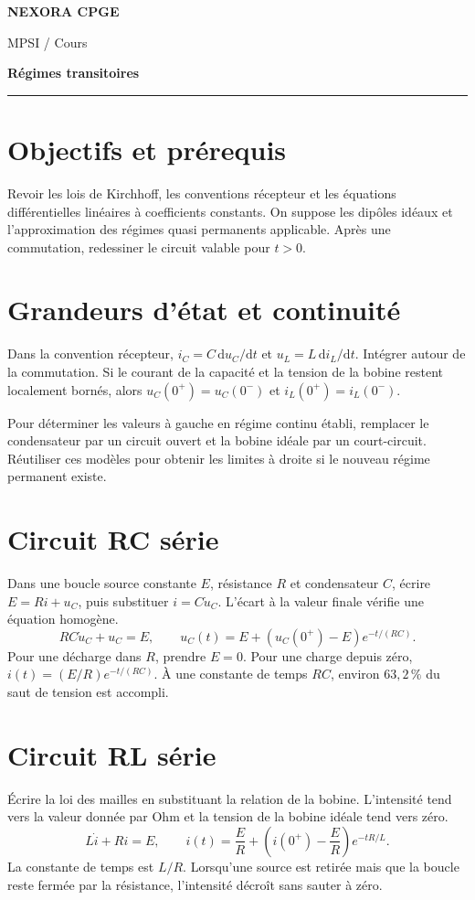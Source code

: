\documentclass[11pt,a4paper]{article}
\begin{document}
\makeatletter
\def\@oddfoot{\footnotesize Download for free at \url{https://openstax.org/details/books/university-physics-volume-2}.\hfil\thepage}
\let\@evenfoot\@oddfoot
\makeatother
{\small\bfseries\color{nexorablue} NEXORA CPGE}\par
{\small MPSI / Cours}\par
{\LARGE\bfseries Régimes transitoires}\par
\vspace{0.25em}\hrule\vspace{0.6em}

\section*{Objectifs et prérequis}
Revoir les lois de Kirchhoff, les conventions récepteur et les équations différentielles linéaires à coefficients constants. On suppose les dipôles idéaux et l’approximation des régimes quasi permanents applicable. Après une commutation, redessiner le circuit valable pour $t>0$.

\section*{Grandeurs d’état et continuité}
Dans la convention récepteur, $i_C=C\,\mathrm du_C/\mathrm dt$ et $u_L=L\,\mathrm di_L/\mathrm dt$. Intégrer autour de la commutation. Si le courant de la capacité et la tension de la bobine restent localement bornés, alors $u_C(0^+)=u_C(0^-)$ et $i_L(0^+)=i_L(0^-)$.

Pour déterminer les valeurs à gauche en régime continu établi, remplacer le condensateur par un circuit ouvert et la bobine idéale par un court-circuit. Réutiliser ces modèles pour obtenir les limites à droite si le nouveau régime permanent existe.

\section*{Circuit RC série}
Dans une boucle source constante $E$, résistance $R$ et condensateur $C$, écrire $E=Ri+u_C$, puis substituer $i=C\dot u_C$. L’écart à la valeur finale vérifie une équation homogène.
\[ RC\dot u_C+u_C=E,\qquad u_C(t)=E+(u_C(0^+)-E)e^{-t/(RC)}. \]
Pour une décharge dans $R$, prendre $E=0$. Pour une charge depuis zéro, $i(t)=(E/R)e^{-t/(RC)}$. À une constante de temps $RC$, environ $63{,}2\,\%$ du saut de tension est accompli.

\section*{Circuit RL série}
Écrire la loi des mailles en substituant la relation de la bobine. L’intensité tend vers la valeur donnée par Ohm et la tension de la bobine idéale tend vers zéro.
\[ L\dot i+Ri=E,\qquad i(t)=\frac ER+\left(i(0^+)-\frac ER\right)e^{-tR/L}. \]
La constante de temps est $L/R$. Lorsqu’une source est retirée mais que la boucle reste fermée par la résistance, l’intensité décroît sans sauter à zéro.
\end{document}
